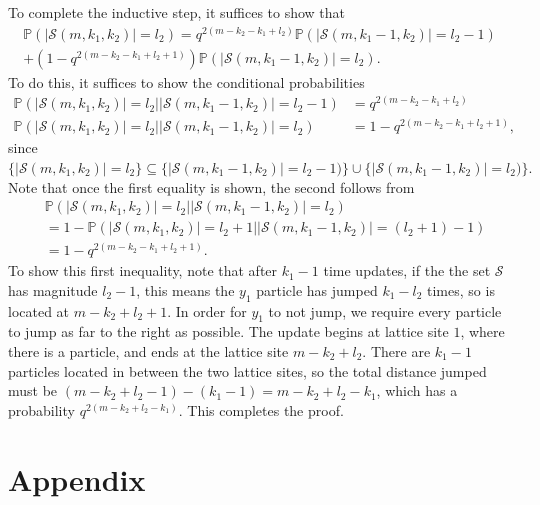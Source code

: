 \documentclass[12pt]{ximera}
\begin{document}
To complete the inductive step, it suffices to show that
\begin{multline*}
\mathbb{P}(\vert \mathcal{S}(m,k_1,k_2)\vert = l_2) = q^{2(m-k_2-k_1+l_2)} \mathbb{P}(\vert \mathcal{S}(m,k_1-1,k_2)\vert = l_2-1)  \\
+ (1-q^{2(m-k_2-k_1+l_2+1)} ) \mathbb{P}(\vert \mathcal{S}(m,k_1-1,k_2)\vert = l_2) .
\end{multline*}
To do this, it suffices to show the conditional probabilities
\begin{align*}
\mathbb{P}(\vert \mathcal{S}(m,k_1,k_2)\vert = l_2 \big| \vert \mathcal{S}(m,k_1-1,k_2)\vert = l_2-1) &=  q^{2(m-k_2-k_1+l_2)} \\
\mathbb{P}(\vert \mathcal{S}(m,k_1,k_2)\vert = l_2 \big| \vert \mathcal{S}(m,k_1-1,k_2)\vert = l_2) &= 1-q^{2(m-k_2-k_1+l_2+1)} ,
\end{align*}
since $\{ \vert \mathcal{S}(m,k_1,k_2)\vert = l_2 \} \subseteq \{\vert \mathcal{S}(m,k_1-1,k_2)\vert = l_2-1)\} \cup \{\vert \mathcal{S}(m,k_1-1,k_2)\vert = l_2)\}.$ Note that once the first equality is shown, the second follows from 
\begin{align*}
&\mathbb{P}(\vert \mathcal{S}(m,k_1,k_2)\vert = l_2 \big| \vert \mathcal{S}(m,k_1-1,k_2)\vert = l_2) \\
&= 1- \mathbb{P}(\vert \mathcal{S}(m,k_1,k_2)\vert = l_2+1 \big| \vert \mathcal{S}(m,k_1-1,k_2)\vert = (l_2+1)-1)\\
&=  1-q^{2(m-k_2-k_1+l_2+1)}.
\end{align*}
To show this first inequality, note that after $k_1-1$ time updates, if the the set $\mathcal{S}$ has magnitude $l_2-1$, this means the $y_1$ particle has jumped $k_1-l_2$ times, so is located at $m-k_2+l_2+1$. In order for $y_1$ to not jump, we require every particle to jump as far to the right as possible. The update begins at lattice site $1$, where there is a particle, and ends at the lattice site $m-k_2+l_2$. There are $k_1-1$ particles located in between the two lattice sites, so the total distance jumped must be $(m-k_2+l_2-1)-(k_1-1)=m-k_2+l_2-k_1$, which has a probability $q^{2(m-k_2+l_2-k_1)}$. This completes the proof. 



\section{Appendix}
\end{document}
